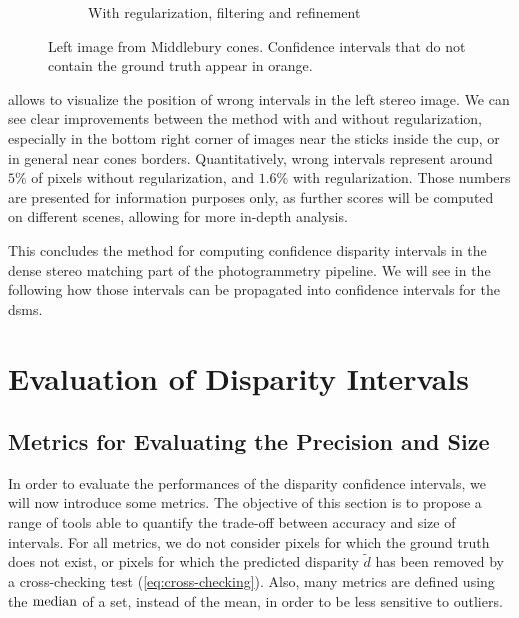 \begin{figure}
\begin{subfigure}[t]{0.49\linewidth}
        \caption{With regularization, filtering and refinement}
        \label{fig:comparison_wrong_intervals_reg}
    \end{subfigure}
    \caption{Left image from Middlebury cones. Confidence intervals that do not contain the ground truth appear in orange.}
    \label{fig:comparison_wrong_intervals}
\end{figure}

 allows to visualize the position of wrong intervals in the left stereo image. We can see clear improvements between the method with and without regularization, especially in the bottom right corner of images near the sticks inside the cup, or in general near cones borders. Quantitatively, wrong intervals represent around $5\%$ of pixels without regularization, and $1.6\%$ with regularization. Those numbers are presented for information purposes only, as further scores will be computed on different scenes, allowing for more in-depth analysis.

This concludes the method for computing confidence disparity intervals in the dense stereo matching part of the photogrammetry pipeline. We will see in the following how those intervals can be propagated into confidence intervals for the \acrshort{dsm}s.

\marquepage


\section{Evaluation of Disparity Intervals}
\subsection{Metrics for Evaluating the Precision and Size}\label{sec:metrics}
In order to evaluate the performances of the disparity confidence intervals, we will now introduce some metrics. The objective of this section is to propose a range of tools able to quantify the trade-off between accuracy and size of intervals. For all metrics, we do not consider pixels for which the ground truth does not exist, or pixels for which the predicted disparity $\tilde{d}$ has been removed by a cross-checking test (\cref{eq:cross-checking}). Also, many metrics are defined using the $\operatorname*{median}$ of a set, instead of the mean, in order to be less sensitive to outliers.

